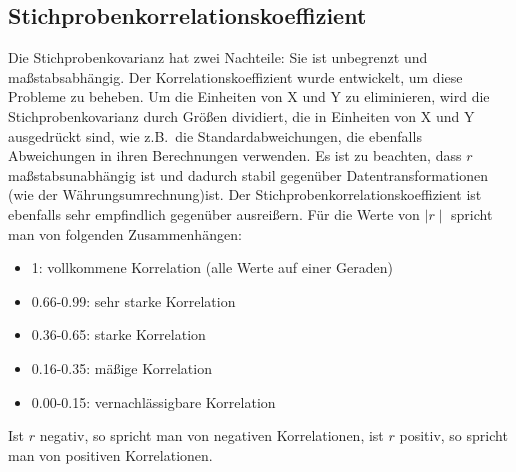 \subsection{Stichprobenkorrelationskoeffizient}
Die Stichprobenkovarianz hat zwei Nachteile: Sie ist unbegrenzt und maßstabsabhängig.
Der Korrelationskoeffizient wurde entwickelt, um diese Probleme zu beheben.
Um die Einheiten von X und Y zu eliminieren, wird die Stichprobenkovarianz durch Größen dividiert, die in Einheiten von X und Y ausgedrückt sind, wie z.B.\ die Standardabweichungen, die ebenfalls Abweichungen in ihren Berechnungen verwenden.
Es ist zu beachten, dass $r$ maßstabsunabhängig ist und dadurch stabil gegenüber Datentransformationen (wie der Währungsumrechnung)ist.
Der Stichprobenkorrelationskoeffizient ist ebenfalls sehr empfindlich gegenüber ausreißern.
\newline
Für die Werte von $\mid r\mid$ spricht man von folgenden Zusammenhängen:
\begin{itemize}
    \item 1: vollkommene Korrelation (alle Werte auf einer Geraden)
    \item 0.66-0.99: sehr starke Korrelation
    \item 0.36-0.65: starke Korrelation
    \item 0.16-0.35: mäßige Korrelation
    \item 0.00-0.15: vernachlässigbare Korrelation
\end{itemize}
Ist $r$ negativ, so spricht man von negativen Korrelationen, ist $r$ positiv, so spricht man von positiven Korrelationen.


